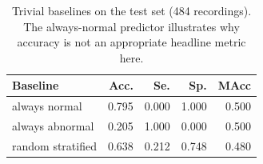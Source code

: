 \begin{table}[t]
\centering
\caption{Trivial baselines on the test set (484 recordings). The always-normal
predictor illustrates why accuracy is not an appropriate headline metric here.}
\label{tab:baselines}
\begin{tabular}{lrrrr}
\toprule
Baseline & Acc. & Se. & Sp. & MAcc \\
\midrule
always normal      & 0.795 & 0.000 & 1.000 & 0.500 \\
always abnormal    & 0.205 & 1.000 & 0.000 & 0.500 \\
random stratified  & 0.638 & 0.212 & 0.748 & 0.480 \\
\bottomrule
\end{tabular}
\end{table}
